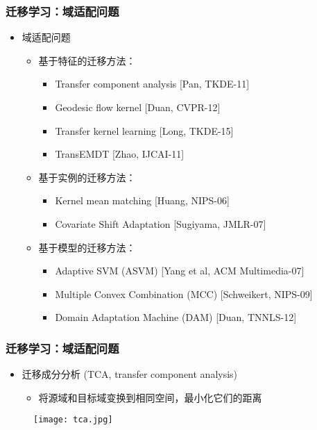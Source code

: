 \begin{frame}
    \frametitle{迁移学习：域适配问题}
    \begin{itemize}
        \item 域适配问题
            \begin{itemize}
                \item 基于特征的迁移方法：
                    \begin{itemize}
                        \item Transfer component analysis [Pan, TKDE-11]
                        \item Geodesic flow kernel [Duan, CVPR-12]
                        \item Transfer kernel learning [Long, TKDE-15]
                        \item TransEMDT [Zhao, IJCAI-11]
                    \end{itemize}
                \item 基于实例的迁移方法：
                    \begin{itemize}
                        \item Kernel mean matching [Huang, NIPS-06]
                        \item Covariate Shift Adaptation [Sugiyama, JMLR-07]
                    \end{itemize}
                \item 基于模型的迁移方法：
                    \begin{itemize}
                        \item Adaptive SVM (ASVM) [Yang et al, ACM Multimedia-07]
                        \item Multiple Convex Combination (MCC) [Schweikert, NIPS-09]
                        \item Domain Adaptation Machine (DAM) [Duan, TNNLS-12]
                    \end{itemize}
            \end{itemize}
    \end{itemize}
\end{frame}

\begin{frame}
    \frametitle{迁移学习：域适配问题}
    \begin{itemize}
        \item 迁移成分分析 (TCA, transfer component analysis) 
            \begin{itemize}
                \item 将源域和目标域变换到相同空间，最小化它们的距离
            \end{itemize}
    \end{itemize}
    \begin{figure}
        \texttt{[image: tca.jpg]}
    \end{figure}
\end{frame}


